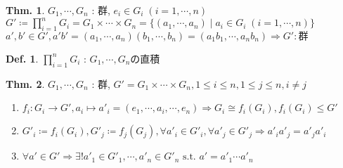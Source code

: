 \documentclass[uplatex,dvipdfmx,9pt]{beamer}
\newcommand{\st}{\text{ s.t. }}
\theoremstyle{definition} %
\newtheorem{defn}{Def.}[subsection] %
\newtheorem{thm}{Thm.}[subsection] %
\theoremstyle{example}
\begin{document}
      \begin{frame}
        
        \begin{thm}
          $G_1, \cdots, G_n$ : 群, $e_i \in G_i \; (i = 1, \cdots, n)$ \\
          $G' \coloneqq \displaystyle\prod_{i=1}^n G_i = G_1 \times \cdots \times G_n = \{(a_1, \cdots, a_n) \mid a_i \in G_i \; (i = 1, \cdots, n)\}$ \\
          $a', b' \in G', a'b' = (a_1, \cdots, a_n)(b_1, \cdots, b_n) = (a_1b_1, \cdots, a_nb_n) \Rightarrow G' : \text{群}$
        \end{thm}

        \begin{defn}
          $\displaystyle \prod_{i=1}^n G_i$ : $G_1, \cdots, G_n$の\alert{直積}
        \end{defn}

        \begin{thm}
          $G_1, \cdots, G_n$ : 群, $G' = G_1 \times \cdots \times G_n, 1 \le i \le n, 1 \le j \le n, i \ne j$ \\
          \begin{enumerate}
            \item $f_i \colon G_i \to G', a_i \mapsto a'_i = (e_1, \cdots, a_i, \cdots, e_n) \Rightarrow G_i \cong f_i(G_i), f_i(G_i) \le G'$
            \item $G'_i \coloneqq f_i(G_i), G'_j \coloneqq f_j(G_j), \forall a'_i \in G'_i, \forall a'_j \in G'_j \Rightarrow a'_ia'_j = a'_ja'_i$
            \item $\forall a' \in G' \Rightarrow \exists! a'_1 \in G'_1, \cdots, a'_n \in G'_n \st a' = a'_1 \cdots a'_n$
          \end{enumerate}
        \end{thm}

      \end{frame}
\end{document}
